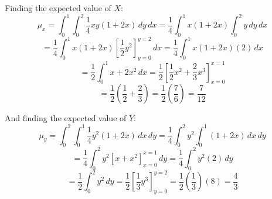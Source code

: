 \begin{Answer}[ref = expect]
Finding the expected value of $X$:
$$\mu_x = \int_0^1 \int_0^2 \frac{1}{4}xy \left(1 + 2x \right)\,dy\,dx = 
\frac{1}{4} \int_0^1 x \left( 1 + 2x \right) \int_0^2 y\,dy\,dx$$
$$= \frac{1}{4} \int_0^1 x \left( 1 + 2x \right) \left[ \frac{1}{2} y^2 \right]_
{y = 0}^{y = 2}\,dx = \frac{1}{4} \int_0^1 x \left(1 + 2x \right) (2)\,dx$$
$$= \frac{1}{2} \int_0^1 x + 2x^2\,dx = \frac{1}{2} \left[ \frac{1}{2}x^2 + 
\frac{2}{3}x^3 \right]_{x = 0}^{x = 1}$$
$$= \frac{1}{2} \left( \frac{1}{2} + \frac{2}{3} \right) = \frac{1}{2} \left( 
\frac{7}{6} \right) = \frac{7}{12}$$

And finding the expected value of $Y$:
$$\mu_y = \int_0^2 \int_0^1 \frac{1}{4}y^2 \left(1 + 2x \right)\,dx\,dy = 
\frac{1}{4} \int_0^2 y^2 \int_0^1 \left( 1 + 2x \right)\,dx\,dy$$
$$= \frac{1}{4} \int_0^2 y^2 \left[x + x^2 \right]_{x = 0}^{x = 1}\,dy = 
\frac{1}{4} \int_0^2 y^2 (2)\,dy$$
$$= \frac{1}{2} \int_0^2 y^2\,dy = \frac{1}{2} \left[ \frac{1}{3}y^3 \right]_{
y = 0}^{y = 2} = \frac{1}{2} \left( \frac{1}{3} \right) (8) = \frac{4}{3}$$
\end{Answer}